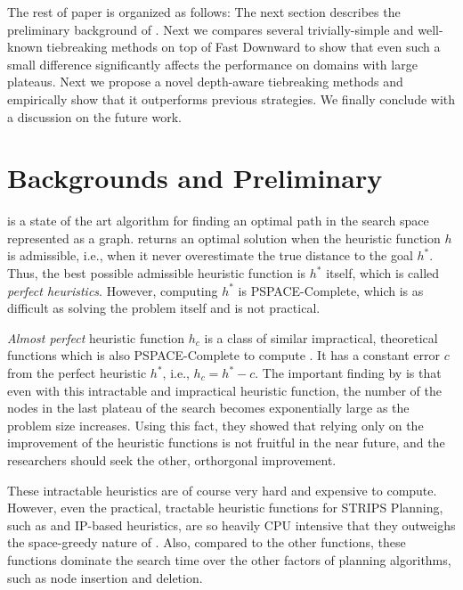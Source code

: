 The rest of paper is organized as follows: The next section describes the
preliminary background of \astar.
Next we compares several trivially-simple and well-known tiebreaking
methods on top of Fast Downward to show that even such a small
difference significantly affects the performance on domains with
large plateaus.
Next we propose a novel depth-aware tiebreaking methods and empirically
show that it outperforms previous strategies.
We finally conclude with a discussion on the future work.

\section{Backgrounds and Preliminary}
\label{sec-1}


\astar is a state of the art algorithm for finding an optimal path in the
search space represented as a graph. 
\astar returns an optimal solution when the heuristic function $h$ is
admissible, i.e., when it never overestimate the true distance to the goal
$h^*$.
% 
Thus, the best possible admissible heuristic function is $h^*$ itself, which is
called \emph{perfect heuristics}. However, computing $h^*$ is PSPACE-Complete,
which is as difficult as solving the problem itself and is not
practical.


\emph{Almost perfect} heuristic function $h_c$ is a class of similar
impractical, theoretical functions which is also PSPACE-Complete to
compute \cite{helmert2008good}.  It has a constant error $c$ from the
perfect heuristic $h^*$, i.e., $h_c=h^*-c$.  The important finding by
\citeauthor{helmert2008good} is that even with this intractable and
impractical heuristic function, the number of the nodes in the last
plateau of the search becomes exponentially large as the problem size
increases.  Using this fact, they showed that relying only on the
improvement of the heuristic functions is not fruitful in the near
future, and the researchers should seek the other,
orthorgonal improvement.

These intractable heuristics are of course very hard and expensive to
compute. However, even the practical, tractable heuristic functions for
STRIPS Planning, such as \lmcut and IP-based heuristics, are so heavily
CPU intensive that they outweighs the space-greedy nature of
\astar. Also, compared to the other functions, these functions dominate
the search time over the other factors of planning algorithms, such as
node insertion and deletion.

